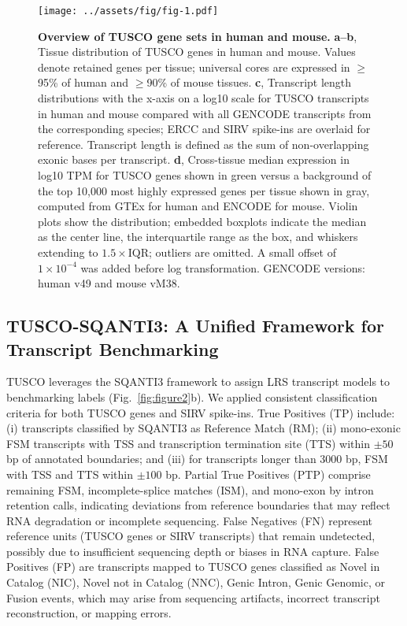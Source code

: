 \documentclass[pdflatex,sn-nature]{sn-jnl}%
\begin{document}
\begin{figure}[p]
    \centering
    \texttt{[image: ../assets/fig/fig-1.pdf]}
    \caption{\textbf{Overview of TUSCO gene sets in human and mouse.} \textbf{a--b}, Tissue distribution of TUSCO genes in human and mouse. Values denote retained genes per tissue; universal cores are expressed in $\geq$95\% of human and $\geq$90\% of mouse tissues. \textbf{c}, Transcript length distributions with the x-axis on a log10 scale for TUSCO transcripts in human and mouse compared with all GENCODE transcripts from the corresponding species; ERCC and SIRV spike-ins are overlaid for reference. Transcript length is defined as the sum of non-overlapping exonic bases per transcript. \textbf{d}, Cross-tissue median expression in log10 TPM for TUSCO genes shown in green versus a background of the top 10,000 most highly expressed genes per tissue shown in gray, computed from GTEx for human and ENCODE for mouse. Violin plots show the distribution; embedded boxplots indicate the median as the center line, the interquartile range as the box, and whiskers extending to $1.5 \times \mathrm{IQR}$; outliers are omitted. A small offset of $1 \times 10^{-4}$ was added before log transformation. GENCODE versions: human v49 and mouse vM38.}
    \label{fig:figure1}
\end{figure}

\subsection{TUSCO-SQANTI3: A Unified Framework for Transcript Benchmarking}

TUSCO leverages the SQANTI3 framework to assign LRS transcript models to benchmarking labels (Fig.~\ref{fig:figure2}b). We applied consistent classification criteria for both TUSCO genes and SIRV spike-ins. True Positives (TP) include: (i) transcripts classified by SQANTI3 as Reference Match (RM); (ii) mono-exonic FSM transcripts with TSS and transcription termination site (TTS) within $\pm 50$ bp of annotated boundaries; and (iii) for transcripts longer than 3000 bp, FSM with TSS and TTS within $\pm 100$ bp. Partial True Positives (PTP) comprise remaining FSM, incomplete-splice matches (ISM), and mono-exon by intron retention calls, indicating deviations from reference boundaries that may reflect RNA degradation or incomplete sequencing. False Negatives (FN) represent reference units (TUSCO genes or SIRV transcripts) that remain undetected, possibly due to insufficient sequencing depth or biases in RNA capture. False Positives (FP) are transcripts mapped to TUSCO genes classified as Novel in Catalog (NIC), Novel not in Catalog (NNC), Genic Intron, Genic Genomic, or Fusion events, which may arise from sequencing artifacts, incorrect transcript reconstruction, or mapping errors.
\end{document}
